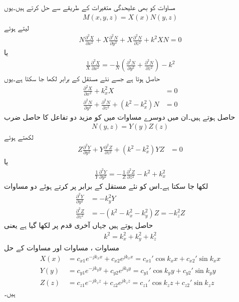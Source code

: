 مساوات  کو بھی علیحدگی متغیرات کے طریقے سے حل کرتے ہیں۔یوں
\begin{align}\label{مساوات_مویج_مستطیلی_گمکی_علیحدگی_الف}
M(x,y,z)=X(x)N(y,z)
\end{align}
لیتے ہوئے
\begin{align*}
N\frac{\partial^2 X}{\partial x^2}+X\frac{\partial^2 N}{\partial y^2}+X\frac{\partial^2 N}{\partial z^2}+k^2 XN=0
\end{align*}
یا
\begin{align*}
\frac{1}{X}\frac{\partial^2 X}{\partial x^2}=-\frac{1}{N}\left(\frac{\partial^2 N}{\partial y^2}+\frac{\partial^2 N}{\partial z^2}\right)-k^2 
\end{align*}
حاصل ہوتا ہے جسے نئے مستقل  کے برابر لکھا جا سکتا ہے۔یوں 
\begin{align}
\frac{\partial^2 X}{\partial x^2}+k_x^2 X&=0 \label{مساوات_مویج_میکس_ویل_عمومی_الف}\\
\frac{\partial^2 N}{\partial y^2}+\frac{\partial^2 N}{\partial z^2}+(k^2 -k_x^2)N &=0
\end{align}
حاصل ہوتے ہیں۔ان میں دوسرے مساوات میں  کو مزید دو تفاعل کا حاصل ضرب
\begin{align}\label{مساوات_مویج_مستطیلی_گمکی_علیحدگی_ب}
N(y,z)=Y(y)Z(z)
\end{align}
 لکھتے ہوئے
\begin{align*}
Z\frac{\partial^2 Y}{\partial y^2}+Y\frac{\partial^2 Z}{\partial z^2}+(k^2 -k_x^2)YZ &=0
\end{align*}
یا
\begin{align*}
\frac{1}{Y}\frac{\partial^2 Y}{\partial y^2}=-\frac{1}{Z}\frac{\partial^2 Z}{\partial z^2}-k^2 +k_x^2
\end{align*}
لکھا جا سکتا ہے۔اس کو نئے مستقل  کے برابر  پر کرتے ہوئے دو مساوات
\begin{align}
\frac{\partial^2 Y}{\partial y^2}&=-k_y^2 Y \label{مساوات_مویج_میکس_ویل_عمومی_ب}\\
\frac{\partial^2 Z}{\partial z^2}&=-(k^2 -k_x^2-k_y^2)Z=-k_z^2 Z \label{مساوات_مویج_میکس_ویل_عمومی_پ}
\end{align}
حاصل ہوتے ہیں جہاں آخری قدم پر  لکھا گیا ہے  یعنی
\begin{align}\label{مساوات_مویج_مستطیلی_گمکی_علیحدگی_پ}
k^2 =k_x^2+k_y^2+k_z^2
\end{align}
مساوات ، مساوات  اور مساوات  کے حل
\begin{align}
X(x)&=c_{x1}e^{- j k_x x}+c_{x2}e^{ j k_x x}  = c_{x1}' \cos {k_x x}+c_{x2}' \sin {k_x x}\label{مساوات_مویج_گمکی_عمومی_الف}\\
Y(y)&=c_{y1} e^{- j k_y y}+c_{y2} e^{ j k_y y}=c_{y1}' \cos{ k_y y}+c_{y2}' \sin{ k_y y}   \label{مساوات_مویج_گمکی_عمومی_ب}\\
Z(z)&=c_{z1} e^{- j k_z z}+c_{z2} e^{j k_z z} =c_{z1}' \cos{  k_z z}+c_{z2}' \sin{ k_z z}  \label{مساوات_مویج_گمکی_عمومی_پ}
\end{align}
ہیں۔

